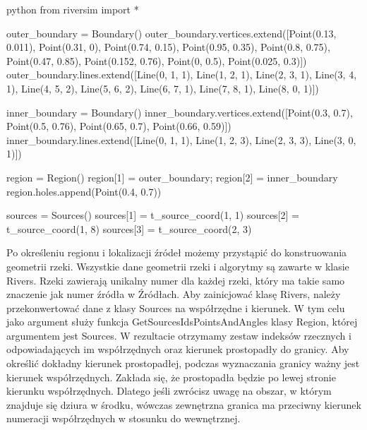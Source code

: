 \documentclass[]{pracamgr}
\begin{document}
      \begin{mintedbox}{python}
        from riversim import *

        outer_boundary = Boundary()
        outer_boundary.vertices.extend([Point(0.13, 0.011), Point(0.31, 0), Point(0.74, 0.15), Point(0.95, 0.35), Point(0.8, 0.75), Point(0.47, 0.85), Point(0.152, 0.76), Point(0, 0.5), Point(0.025, 0.3)])
        outer_boundary.lines.extend([Line(0, 1, 1), Line(1, 2, 1), Line(2, 3, 1), Line(3, 4, 1), Line(4, 5, 2), Line(5, 6, 2), Line(6, 7, 1), Line(7, 8, 1), Line(8, 0, 1)])

        inner_boundary = Boundary()
        inner_boundary.vertices.extend([Point(0.3, 0.7), Point(0.5, 0.76), Point(0.65, 0.7), Point(0.66, 0.59)])
        inner_boundary.lines.extend([Line(0, 1, 1), Line(1, 2, 3), Line(2, 3, 3), Line(3, 0, 1)])

        region = Region()
        region[1] = outer_boundary; region[2] = inner_boundary
        region.holes.append(Point(0.4, 0.7))

        sources = Sources()
        sources[1] = t_source_coord(1, 1) 
        sources[2] = t_source_coord(1, 8) 
        sources[3] = t_source_coord(2, 3)\end{mintedbox}

      Po określeniu regionu i lokalizacji źródeł możemy przystąpić do konstruowania geometrii rzeki. Wszystkie dane geometrii rzeki i algorytmy są zawarte w klasie Rivers. Rzeki zawierają unikalny numer dla każdej rzeki, który ma takie samo znaczenie jak numer źródła w Źródłach. Aby zainicjować klasę Rivers, należy przekonwertować dane z klasy Sources na współrzędne i kierunek. W tym celu jako argument służy funkcja GetSourcesIdsPointsAndAngles klasy Region, której argumentem jest Sources. W rezultacie otrzymamy zestaw indeksów rzecznych i odpowiadających im współrzędnych oraz kierunek prostopadły do granicy. Aby określić dokładny kierunek prostopadłej, podczas wyznaczania granicy ważny jest kierunek współrzędnych. Zakłada się, że prostopadła będzie po lewej stronie kierunku współrzędnych. Dlatego jeśli zwrócisz uwagę na obszar, w którym znajduje się dziura w środku, wówczas zewnętrzna granica ma przeciwny kierunek numeracji współrzędnych w stosunku do wewnętrznej.
      
\end{document}
